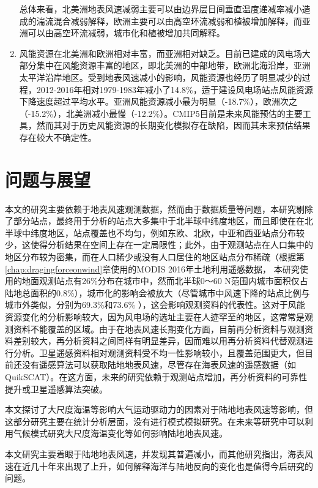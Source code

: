 \begin{enumerate}
总体来看，北美洲地表风速减弱主要可以由边界层日间垂直温度递减率减小造成的湍流混合减弱解释，欧洲主要可以由高空环流减弱和植被增加解释，而亚洲可以由高空环流减弱，城市化和植被增加共同解释。

\item 风能资源在北美洲和欧洲相对丰富，而亚洲相对缺乏。目前已建成的风电场大部分集中在风能资源丰富的地区，即北美洲的中部地带，欧洲北海沿岸，亚洲太平洋沿岸地区。受到地表风速减小的影响，风能资源也经历了明显减少的过程，2012-2016年相对1979-1983年减小了14.8\%，适于建设风电场站点风能资源下降速度超过平均水平。亚洲风能资源减小最为明显（-18.7\%），欧洲次之（-15.2\%），北美洲减小最慢（-12.2\%）。CMIP5目前是未来风能预估的主要工具，然而其对于历史风能资源的长期变化模拟存在缺陷，因而其未来预估结果存在较大不确定性。

\end{enumerate}

\section{问题与展望}

本文的研究主要依赖于地表风速观测数据，然而由于数据质量等问题，本研究剔除了部分站点，最终用于分析的站点大多集中于北半球中纬度地区，而且即使在在北半球中纬度地区，站点覆盖也不均匀，例如东欧、北欧，中亚和西亚站点分布较少，这使得分析结果在空间上存在一定局限性；此外，由于观测站点在人口集中的地区分布较为密集，而在人口稀少或没有人口居住的地区站点分布稀疏（根据第\ref{chap:dragingforceonwind}章使用的MODIS 2016年土地利用遥感数据， 本研究使用的地面观测站点有26\%分布在城市中，然而北半球0～60 N范围内城市面积仅占陆地总面积的0.8\%），城市化的影响会被放大（尽管城市中风速下降的站点比例与城市外类似，分别为69.3\%和73.6\% ），这会影响观测资料的代表性。这对于风能资源变化的分析影响较大，因为风电场的选址主要在人迹罕至的地区，这常常是观测资料不能覆盖的区域。由于在地表风速长期变化方面，目前再分析资料与观测资料差别较大，再分析资料之间同样有明显差异，因而难以用再分析资料代替观测进行分析。卫星遥感资料相对观测资料受不均一性影响较小，且覆盖范围更大，但目前还没有遥感算法可以获取陆地地表风速，尽管存在海表风速的遥感数据（如QuikSCAT）。在这方面，未来的研究依赖于观测站点增加，再分析资料的可靠性提升或卫星遥感算法突破。

本文探讨了大尺度海温等影响大气运动驱动力的因素对于陆地地表风速等影响，但这部分研究主要在统计分析层面，没有进行模式模拟研究。在未来等研究中可以利用气候模式研究大尺度海温变化等如何影响陆地地表风速。

本文研究主要着眼于陆地地表风速，并发现其普遍减小，而其他研究指出，海表风速在近几十年来出现了上升，如何解释海洋与陆地反向的变化也是值得今后研究的问题。


